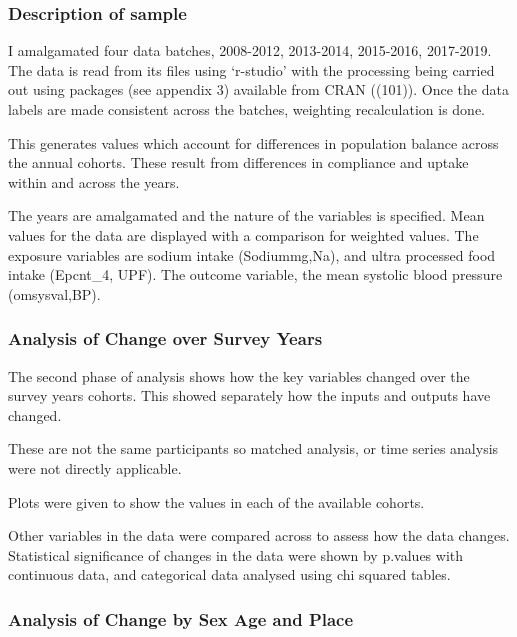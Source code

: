 \documentclass[
]{article}
\begin{document}
\hypertarget{description-of-sample}{%
\subsubsection{Description of sample}\label{description-of-sample}}

I amalgamated four data batches, 2008-2012, 2013-2014, 2015-2016,
2017-2019. The data is read from its files using `r-studio' with the
processing being carried out using packages (see appendix 3) available
from CRAN ((101)). Once the data labels are made consistent across the
batches, weighting recalculation is done.

This generates values which account for differences in population
balance across the annual cohorts. These result from differences in
compliance and uptake within and across the years.

The years are amalgamated and the nature of the variables is specified.
Mean values for the data are displayed with a comparison for weighted
values. The exposure variables are sodium intake (Sodiummg,Na), and
ultra processed food intake (Epcnt\_4, UPF). The outcome variable, the
mean systolic blood pressure (omsysval,BP).

\hypertarget{analysis-of-change-over-survey-years}{%
\subsubsection{Analysis of Change over Survey
Years}\label{analysis-of-change-over-survey-years}}

The second phase of analysis shows how the key variables changed over
the survey years cohorts. This showed separately how the inputs and
outputs have changed.

These are not the same participants so matched analysis, or time series
analysis were not directly applicable.

Plots were given to show the values in each of the available cohorts.

Other variables in the data were compared across to assess how the data
changes. Statistical significance of changes in the data were shown by
p.values with continuous data, and categorical data analysed using chi
squared tables.

\hypertarget{analysis-of-change-by-sex-age-and-place}{%
\subsubsection{Analysis of Change by Sex Age and
Place}\label{analysis-of-change-by-sex-age-and-place}}
\end{document}
